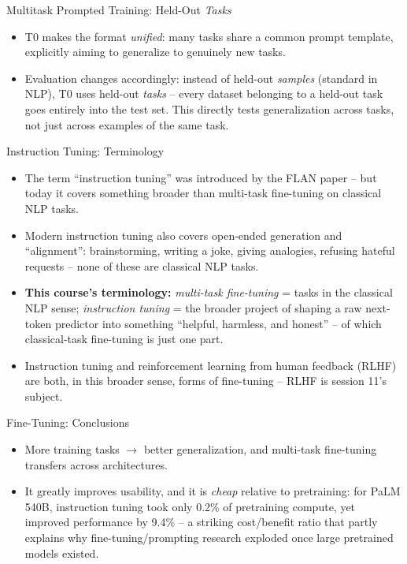 \begin{vbframe}{Multitask Prompted Training: Held-Out \textit{Tasks}}
\begin{itemize}
  \item T0  makes the format \textit{unified}: many tasks share a common prompt template, explicitly aiming to generalize to genuinely new tasks.
  \item Evaluation changes accordingly: instead of held-out \textit{samples} (standard in NLP), T0 uses held-out \textit{tasks} -- every dataset belonging to a held-out task goes entirely into the test set. This directly tests generalization across tasks, not just across examples of the same task.
\end{itemize}
\end{vbframe}

\begin{vbframe}{Instruction Tuning: Terminology}
\begin{itemize}
  \item The term ``instruction tuning'' was introduced by the FLAN paper  -- but today it covers something broader than multi-task fine-tuning on classical NLP tasks.
  \item Modern instruction tuning also covers open-ended generation and ``alignment'': brainstorming, writing a joke, giving analogies, refusing hateful requests -- none of these are classical NLP tasks.
  \item \textbf{This course's terminology:} \textit{multi-task fine-tuning} = tasks in the classical NLP sense; \textit{instruction tuning} = the broader project of shaping a raw next-token predictor into something ``helpful, harmless, and honest'' -- of which classical-task fine-tuning is just one part.
  \item Instruction tuning and reinforcement learning from human feedback (RLHF) are both, in this broader sense, forms of fine-tuning -- RLHF is session 11's subject.
\end{itemize}
\end{vbframe}

\begin{vbframe}{Fine-Tuning: Conclusions}
\begin{itemize}
  \item More training tasks $\to$ better generalization, and multi-task fine-tuning transfers across architectures.
  \item It greatly improves usability, and it is \textit{cheap} relative to pretraining: for PaLM 540B, instruction tuning took only 0.2\% of pretraining compute, yet improved performance by 9.4\% -- a striking cost/benefit ratio that partly explains why fine-tuning/prompting research exploded once large pretrained models existed.
\end{itemize}
\end{vbframe}

